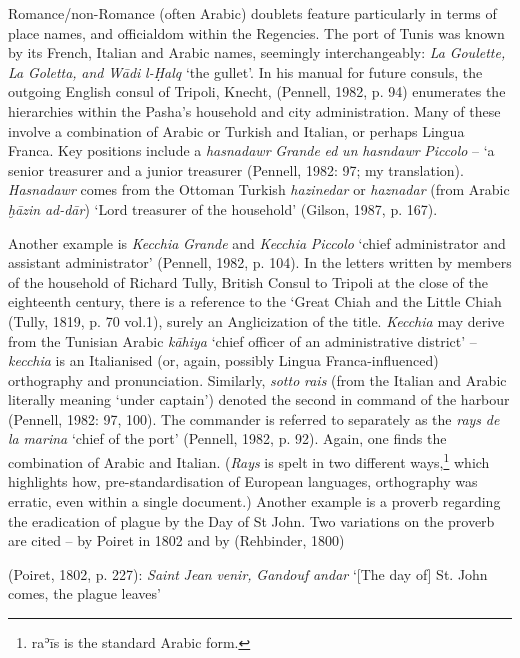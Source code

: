 \documentclass[output=paper]{langsci/langscibook}
\begin{document}
Romance/non-Romance (often Arabic) doublets feature particularly in terms of place names, and officialdom within the Regencies. The port of Tunis was known by its French, Italian and Arabic names, seemingly interchangeably: \textit{La} \textit{Goulette,} \textit{La} \textit{Goletta,} \textit{and} \textit{Wādi} \textit{l-Ḥalq} ‘the gullet’. In his manual for future consuls, the outgoing English consul of Tripoli, Knecht, (Pennell, 1982, p. 94) enumerates the hierarchies within the Pasha’s household and city administration. Many of these involve a combination of Arabic or Turkish and Italian, or perhaps Lingua Franca. Key positions include a \textit{hasnadawr} \textit{Grande} \textit{ed} \textit{un} \textit{hasndawr} \textit{Piccolo} – ‘a senior treasurer and a junior treasurer (Pennell, 1982: 97; my translation).  \textit{Hasnadawr} comes from the Ottoman Turkish \textit{hazinedar} or \textit{haznadar} (from Arabic \textit{ḫāzin} \textit{ad-dār}) ‘Lord treasurer of the household’ (Gilson, 1987, p. 167).

Another example is \textit{Kecchia} \textit{Grande} and \textit{Kecchia} \textit{Piccolo} ‘chief administrator and assistant administrator’ (Pennell, 1982, p. 104). In the letters written by members of the household of Richard Tully, British Consul to Tripoli at the close of the eighteenth century, there is a reference to the ‘Great Chiah and the Little Chiah (Tully, 1819, p. 70 vol.1), surely an Anglicization of the title. \textit{Kecchia} may derive from the Tunisian Arabic \textit{kāhiya} ‘chief officer of an administrative district’ – \textit{kecchia} is an Italianised (or, again, possibly Lingua Franca-influenced) orthography and pronunciation. Similarly, \textit{sotto} \textit{rais} (from the Italian and Arabic literally meaning ‘under captain’) denoted the second in command of the harbour (Pennell, 1982: 97, 100). The commander is referred to separately as the \textit{rays} \textit{de} \textit{la} \textit{marina} ‘chief of the port’ (Pennell, 1982, p. 92). Again, one finds the combination of Arabic and Italian. (\textit{Rays} is spelt in two different ways,\footnote{raʾīs is the standard Arabic form.} which highlights how, pre-standardisation of European languages, orthography was erratic, even within a single document.) Another example is a proverb regarding the eradication of plague by the Day of St John. Two variations on the proverb are cited – by Poiret in 1802 and by (Rehbinder, 1800) 

(Poiret, 1802, p. 227): \textit{Saint} \textit{Jean} \textit{venir,} \textit{Gandouf} \textit{andar} ‘[The day of] St. John comes, the plague leaves’
\end{document}
